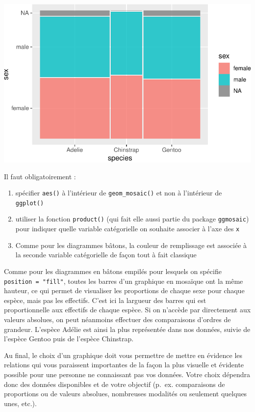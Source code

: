 \documentclass[
  a4paper,
  DIV=11,
  numbers=noendperiod,
  oneside]{scrreprt}
\providecommand{\tightlist}{%
  \setlength{\itemsep}{0pt}\setlength{\parskip}{0pt}}\usepackage{longtable,booktabs,array}
\begin{document}
\includegraphics{03-visualization_files/figure-pdf/unnamed-chunk-67-1.pdf}

Il faut obligatoirement :

\begin{enumerate}
\def\labelenumi{\arabic{enumi}.}
\tightlist
\item
  spécifier \texttt{aes()} à l'intérieur de \texttt{geom\_mosaic()} et
  non à l'intérieur de \texttt{ggplot()}
\item
  utiliser la fonction \texttt{product()} (qui fait elle aussi partie du
  package \texttt{ggmosaic}) pour indiquer quelle variable catégorielle
  on souhaite associer à l'axe des \texttt{x}
\item
  Comme pour les diagrammes bâtons, la couleur de remplissage est
  associée à la seconde variable catégorielle de façon tout à fait
  classique
\end{enumerate}

Comme pour les diagrammes en bâtons empilés pour lesquels on spécifie
\texttt{position\ =\ "fill"}, toutes les barres d'un graphique en
mosaïque ont la même hauteur, ce qui permet de visualiser les
proportions de chaque sexe pour chaque espèce, mais pas les effectifs.
C'est ici la largueur des barres qui est proportionnelle aux effectifs
de chaque espèce. Si on n'accède par directement aux valeurs absolues,
on peut néanmoins effectuer des comparaisons d'ordres de grandeur.
L'espèce Adélie est ainsi la plus représentée dans nos données, suivie
de l'espèce Gentoo puis de l'espèce Chinstrap.

Au final, le choix d'un graphique doit vous permettre de mettre en
évidence les relations qui vous paraissent importantes de la façon la
plus visuelle et évidente possible pour une personne ne connaissant pas
vos données. Votre choix dépendra donc des données disponibles et de
votre objectif (p.~ex. comparaisons de proportions ou de valeurs
absolues, nombreuses modalités ou seulement quelques unes, etc.).
\end{document}
